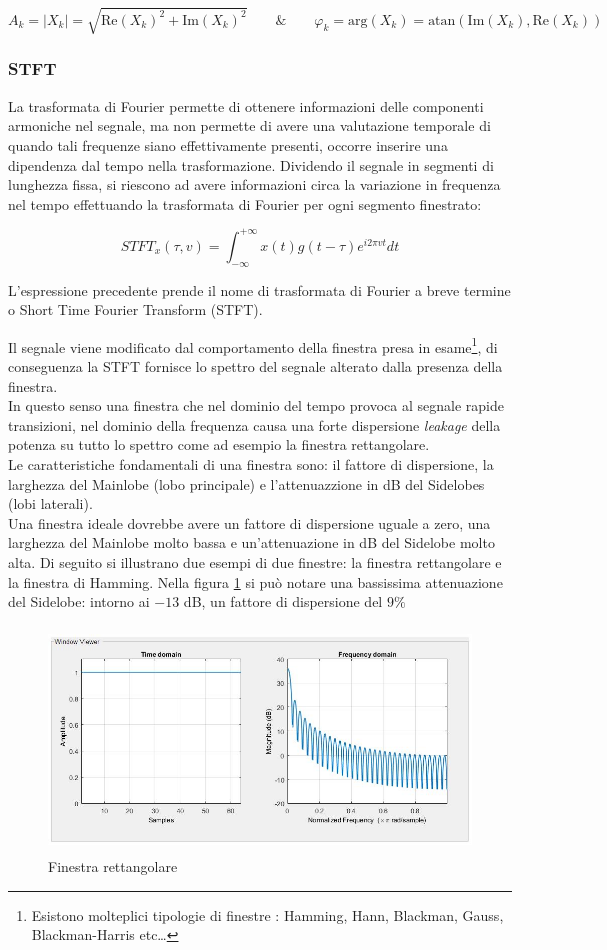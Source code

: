 \documentclass[12pt]{report}
\begin{document}
$$ A_k = |X_k| = \sqrt{{\mbox{Re}(X_k)}^2 + \mbox{Im}(X_k)^2} \qquad \mbox{\&} \qquad
	\varphi_k = \mbox{arg}(X_k) = \mbox{atan}(\mbox{Im}(X_k),\mbox{Re}(X_k)) $$
		
		\subsubsection{STFT}
		\label{cap2sec3_5}
		La trasformata di Fourier permette di ottenere informazioni delle componenti armoniche nel segnale, ma non permette di avere una valutazione temporale di quando tali frequenze siano effettivamente presenti, occorre inserire una dipendenza dal tempo nella trasformazione.
Dividendo il segnale in segmenti di lunghezza fissa, si riescono ad avere informazioni circa la variazione in frequenza nel tempo effettuando la trasformata di Fourier per ogni segmento finestrato:

$$ STFT_x(\tau,v) = \int_{-\infty}^{+\infty} x(t)g(t-\tau)e^{i2\pi vt}dt $$

L'espressione precedente prende il nome di trasformata di Fourier a breve termine o Short Time Fourier Transform (STFT).

Il segnale viene modificato dal comportamento della finestra presa in esame\footnote{Esistono molteplici tipologie di finestre : Hamming, Hann, Blackman, Gauss, Blackman-Harris etc\dots}, di conseguenza la STFT fornisce lo spettro del segnale alterato dalla presenza della finestra.\\
In questo senso una finestra che nel dominio del tempo provoca al segnale rapide transizioni, nel dominio della frequenza causa una forte dispersione {\itshape leakage} della potenza su tutto lo spettro come ad esempio la finestra rettangolare.
\\

Le caratteristiche fondamentali di una finestra sono: il fattore di dispersione, la larghezza del Mainlobe (lobo principale) e l'attenuazzione in dB del Sidelobes (lobi laterali).\\
Una finestra ideale dovrebbe avere un fattore di dispersione uguale a zero, una larghezza del Mainlobe molto bassa e un'attenuazione in dB del Sidelobe molto alta. Di seguito si illustrano due esempi di due finestre: la finestra rettangolare e la finestra di Hamming.
\clearpage
Nella figura \ref{fig:rect_fun} si può notare una bassissima attenuazione del Sidelobe: intorno ai $-13$ dB, un fattore di dispersione del $9\%$

\begin{figure}[htbp]
\centerline{\includegraphics[height=60mm]{img/rect_fun}}
\caption{Finestra rettangolare}
\label{fig:rect_fun}
\end{figure}
\end{document}
